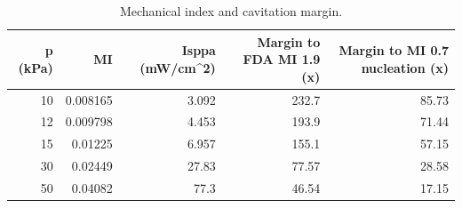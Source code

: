 \begin{table}
\caption{Mechanical index and cavitation margin.}
\label{tab:T_S8_mi}
\begin{tabular}{rrrrr}
\toprule
p (kPa) & MI & Isppa (mW/cm\textasciicircum 2) & Margin to FDA MI 1.9 (x) & Margin to MI 0.7 nucleation (x) \\
\midrule
10 & 0.008165 & 3.092 & 232.7 & 85.73 \\
12 & 0.009798 & 4.453 & 193.9 & 71.44 \\
15 & 0.01225 & 6.957 & 155.1 & 57.15 \\
30 & 0.02449 & 27.83 & 77.57 & 28.58 \\
50 & 0.04082 & 77.3 & 46.54 & 17.15 \\
\bottomrule
\end{tabular}
\end{table}
